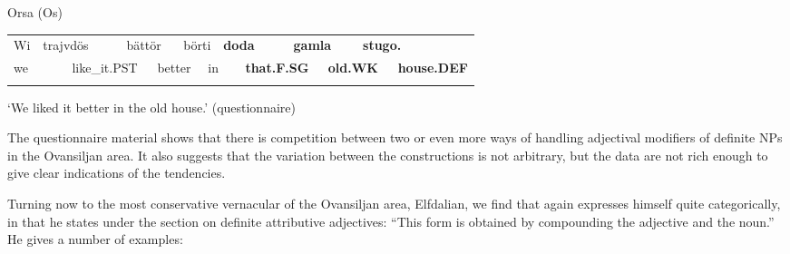\begin{listWWNumileveli}
\item {}

\begin{styleExample}
Orsa (Os)

\end{styleExample}

\end{listWWNumileveli}

\begin{tabular}{llllllllllllll}
\lsptoprule
Wi & \multicolumn{2}{l}{trajvdös

} & \multicolumn{2}{l}{bättör

} & \multicolumn{2}{l}{börti

} & \multicolumn{2}{l}{{\bfseries doda}

} & \multicolumn{2}{l}{{\bfseries gamla}

} & \multicolumn{2}{l}{{\bfseries stugo.}

} & \\
\multicolumn{2}{l}{we

} & \multicolumn{2}{l}{like\_it.PST

} & \multicolumn{2}{l}{better

} & \multicolumn{2}{l}{in

} & \multicolumn{2}{l}{{\bfseries that.F.SG}

} & \multicolumn{2}{l}{{\bfseries old.WK}

} & \multicolumn{2}{l}{{\bfseries house.DEF}

}\\
\lspbottomrule
\end{tabular}

\begin{styleTranslation}
‘We liked it better in the old house.’ (questionnaire)

\end{styleTranslation}

\begin{styleBodyTextFirst}
The questionnaire material shows that there is competition between two or even more ways of handling adjectival modifiers of definite NPs in the Ovansiljan area. It also suggests that the variation between the constructions is not arbitrary, but the data are not rich enough to give clear indications of the tendencies. 

\end{styleBodyTextFirst}

\begin{styleBodytextC}
Turning now to the most conservative vernacular of the Ovansiljan area, Elfdalian, we find that \citet[53]{Levander1909} again expresses himself quite categorically, in that he states under the section on definite attributive adjectives: “This form is obtained by compounding the adjective and the noun.” He gives a number of examples:

\end{styleBodytextC}

